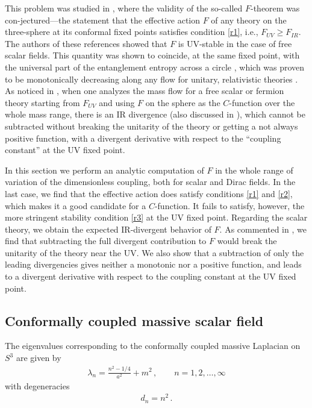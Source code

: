\documentclass[12pt,a4paper]{article}
\newcommand{\beq}{\begin{eqnarray}}
\newcommand{\eeq}{\end{eqnarray}}
\numberwithin{equation}{section}
\begin{document}
This problem was studied in \cite{Jafferis:2011zi,kleF}, where the validity of the so-called $F$-theorem was con-jectured---the statement that the effective action $F$ of any theory on the three-sphere at its conformal fixed points satisfies condition \ref{r1}, i.e., $F_{UV}\geq F_{IR}$. The authors of these references showed that $F$ is UV-stable in the case of free scalar fields. This quantity was shown to coincide, at the same fixed point, with the universal part of the entanglement entropy across a circle \cite{Casini:2011kv}, which was proven to be monotonically decreasing along any flow for unitary, relativistic theories \cite{casini}. As noticed in \cite{kleF}, when one analyzes the mass flow for a free scalar or fermion theory starting from $F_{UV}$ and using $F$ on the sphere as the $C$-function over the whole mass range, there is an IR divergence (also discussed in \cite{dowkermasssphere}), which cannot be subtracted without breaking the unitarity of the theory or getting a not always positive function, with a divergent derivative with respect to the ``coupling constant'' at the UV fixed point.

In this section we perform an analytic computation of $F$ in the whole range of variation of the dimensionless coupling, both for scalar and Dirac fields. In the last case, we find that the effective action does satisfy conditions \ref{r1} and \ref{r2}, which makes it a good candidate for a $\textit{C}$-function. It fails to satisfy, however, the more stringent stability condition \ref{r3} at the UV fixed point. Regarding the scalar theory, we obtain the expected IR-divergent behavior of $F$. As commented in \cite{kleF,dowkermasssphere}, we find that subtracting the full divergent contribution to $F$ would break the unitarity of the theory near the UV. We also show that a subtraction of only the leading divergencies gives neither a monotonic nor a positive function, and leads to a divergent derivative with respect to the coupling constant at the UV fixed point.

\subsection{Conformally coupled massive scalar field}

The eigenvalues corresponding to the conformally coupled massive Laplacian on $S^3$ are given by
\beq
\lambda_n = \frac{n^2 - 1/4}{a^2} + m^2\,,\qquad n=1,2,\ldots,\infty
\eeq
with degeneracies
\beq
d_n  =n^2\,.
\eeq
\end{document}
